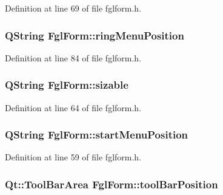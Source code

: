Definition at line 69 of file fglform.h.

\hypertarget{classFglForm_ab0e939affc05fa6c0297dcf7c257b25f}{
\subsubsection[{ringMenuPosition}]{\setlength{\rightskip}{0pt plus 5cm}QString FglForm::ringMenuPosition}}
\label{classFglForm_ab0e939affc05fa6c0297dcf7c257b25f}


Definition at line 84 of file fglform.h.

\hypertarget{classFglForm_a2e26a9f76fe7c63c8103ac4b04776e81}{
\subsubsection[{sizable}]{\setlength{\rightskip}{0pt plus 5cm}QString FglForm::sizable}}
\label{classFglForm_a2e26a9f76fe7c63c8103ac4b04776e81}


Definition at line 64 of file fglform.h.

\hypertarget{classFglForm_aec7035cbd1e5a013f2d96a1a3a98aa53}{
\subsubsection[{startMenuPosition}]{\setlength{\rightskip}{0pt plus 5cm}QString FglForm::startMenuPosition}}
\label{classFglForm_aec7035cbd1e5a013f2d96a1a3a98aa53}


Definition at line 59 of file fglform.h.

\hypertarget{classFglForm_afc1641787bae0be3864cce6efdea9e17}{
\subsubsection[{toolBarPosition}]{\setlength{\rightskip}{0pt plus 5cm}Qt::ToolBarArea FglForm::toolBarPosition}}
\label{classFglForm_afc1641787bae0be3864cce6efdea9e17}


